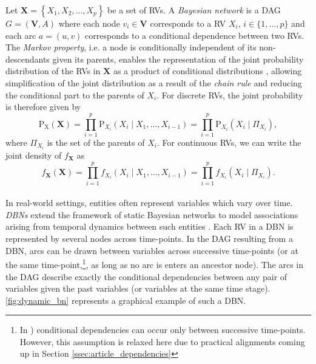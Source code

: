 
Let $\mathbf{X}=\left\{X_{1}, X_{2}, \ldots, X_{p}\right\}$ be a set of \acp{RV}. A \textit{Bayesian network} is a \ac{DAG} $G = (\bm{V},A)$ where each node $v_i \in \bm{V}$ corresponds to a \ac{RV} $X_i$, $i \in \{1, \ldots, p\}$ and each arc $a = (u,v)$ corresponds to a conditional dependence between two \acp{RV}. The \textit{Markov property}, i.e. a node is conditionally independent of its non-descendants given its parents, enables the representation of the joint probability distribution of the \acp{RV} in $\bm{X}$ as a product of conditional distributions \citep{nagarajan2013bayesian}, allowing simplification of the joint distribution as a result of the \textit{chain rule} and reducing the conditional part to the parents of $X_i$. For discrete \acp{RV}, the joint probability is therefore given by 
\begin{equation}
\mathrm{P}_{\bm{\mathrm{X}}}(\mathbf{X})=
\prod_{i=1}^{p} \mathrm{P}_{X_i}\left(X_{i} \mid X_{1}, \ldots, X_{i-1}\right) =
\prod_{i=1}^{p} \mathrm{P}_{X_{i}}\left(X_{i} \mid \Pi_{X_{i}}\right),
\end{equation}
where $\Pi_{X_{i}}$ is the set of the parents of $X_i$. For continuous \acp{RV}, we can write the joint density of $f_{\mathbf{X}}$ as
\begin{equation}
f_{\mathbf{X}}(\mathbf{X})=
\prod_{i=1}^{p} f_{X_i}\left(X_{i} \mid X_{1}, \ldots, X_{i-1}\right) =
\prod_{i=1}^{p} f_{X_{i}}\left(X_{i} \mid \Pi_{X_{i}}\right).
\end{equation}
\\

In real-world settings, entities often represent variables which vary over time. \textit{\acp{DBN}} extend the framework of static Bayesian networks to model associations arising from temporal dynamics between such entities \citep{nagarajan2013bayesian}. Each \ac{RV} in a \ac{DBN} is represented by several nodes across time-points. In the \ac{DAG} resulting from a \ac{DBN}, arcs can be drawn between variables across successive time-points (or at the same time-point,\footnote{In \cite{nagarajan2013bayesian}) conditional dependencies can occur only between successive time-points. However, this assumption is relaxed here due to practical alignments coming up in Section \ref{ssec:article_dependencies}}, as long as no arc is enters an ancestor node). The arcs in the \ac{DAG} describe exactly the conditional dependencies between any pair of variables given the past variables (or variables at the same time stage). \autoref{fig:dynamic_bn} represents a graphical example of such a \ac{DBN}.
\\


